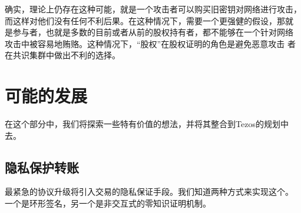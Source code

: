\documentclass[letterpaper]{article}
\begin{document}
确实，理论上仍存在这种可能，就是一个攻击者可以购买旧密钥对网络进行攻击，
而这样对他们没有任何不利后果。在这种情况下，需要一个更强健的假设，那就
是参与者，也就是多数的目前或者从前的股权持有者，都不能够在一个针对网络
攻击中被容易地贿赂。这种情况下，``股权''在股权证明的角色是避免恶意攻击
者在共识集群中做出不利的选择。


\section{可能的发展}

在这个部分中，我们将探索一些特有价值的想法，并将其整合到Tezos的规划中
去。

\subsection{隐私保护转账}
最紧急的协议升级将引入交易的隐私保证手段。我们知道两种方式来实现这个。
一个是环形签名，另一个是非交互式的零知识证明机制。

\end{document}
